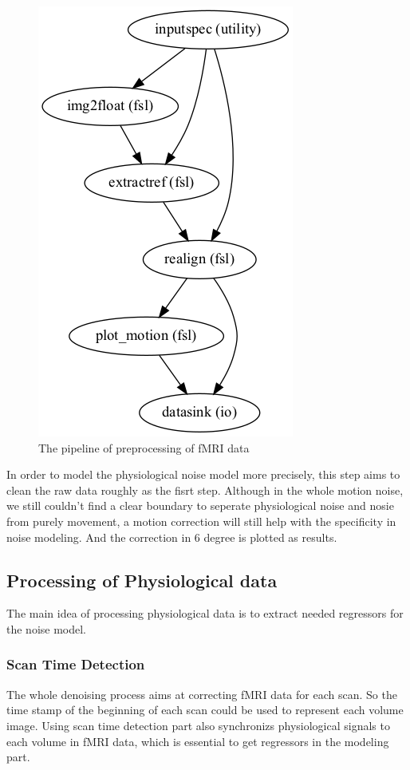 \begin{figure}[htp]
    \centering
    \includegraphics[width=0.7\columnwidth]{Figures/gragh.png}
    \caption{The pipeline of preprocessing of fMRI data}
    \label{fig:graph}
\end{figure}

In order to model the physiological noise model more precisely, 
this step aims to clean the raw data roughly as the fisrt step.
Although in the whole motion noise, we still couldn't find a clear boundary
to seperate physiological noise and nosie from purely movement, a motion correction will
still help with the specificity in noise modeling. And the correction in 6 degree is plotted 
as results.

\subsection{Processing of Physiological data}
The main idea of processing physiological data is to extract needed regressors for the noise model.

\subsubsection{Scan Time Detection}
The whole denoising process aims at correcting fMRI data for each scan. 
So the time stamp of the beginning of each scan could be used to represent each volume image. 
Using scan time detection part also synchronizs physiological signals to each volume in fMRI data,
which is essential to get regressors in the modeling part.

